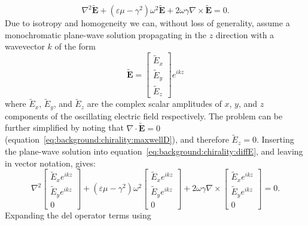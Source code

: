 \begin{equation}\label{eq:background:chirality:diffE}
    \nabla^2 \mathbf{\tilde E} + (\varepsilon \mu - \gamma^2)\omega^2 \mathbf{\tilde E} + 2 \omega \gamma \nabla \times \mathbf{\tilde E} = 0.
\end{equation}
Due to isotropy and homogeneity we can, without loss of generality, assume a monochromatic plane-wave solution propagating in the $z$ direction with a wavevector $k$ of the form
\begin{equation}
    \mathbf{\tilde E} = \begin{bmatrix}
        \tilde E_x \\
        \tilde E_y \\
        \tilde E_z
      \end{bmatrix} e^{i k z}
\end{equation}
where $\tilde E_x$, $\tilde E_y$, and $\tilde E_z$ are the complex scalar amplitudes of $x$, $y$, and $z$ components of the oscillating electric field respectively. The problem can be further simplified by noting that $\nabla \cdot \mathbf{\tilde E} = 0$ (equation~\ref{eq:background:chirality:maxwellD}), and therefore $\tilde E_z = 0$. Inserting the plane-wave solution into equation~\ref{eq:background:chirality:diffE}, and leaving in vector notation, gives:
\begin{equation}\label{eq:background:chirality:diffEvec}
    \nabla^2 \begin{bmatrix}\tilde E_x e^{i k z}\\ \tilde E_y e^{i k z} \\0 \end{bmatrix}+ (\varepsilon \mu - \gamma^2)\omega^2 \begin{bmatrix}\tilde E_x e^{i k z}\\ \tilde E_y e^{i k z} \\0 \end{bmatrix} + 2 \omega \gamma \nabla \times \begin{bmatrix}\tilde E_x e^{i k z}\\ \tilde E_y e^{i k z} \\0 \end{bmatrix} = 0.
\end{equation}
Expanding the del operator terms using
